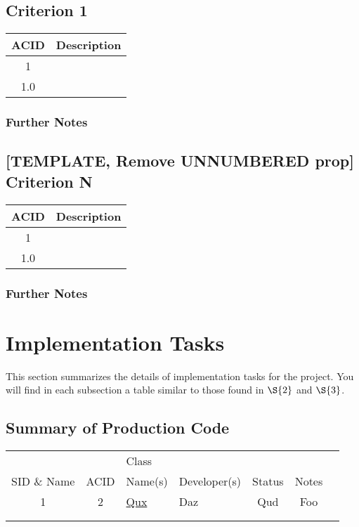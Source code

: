 \documentclass[11pt]{article}
\begin{document}
\subsection{Criterion 1}
\label{sec:org4e14e24}
\begin{center}
\begin{tabular}{|c|l|}
ACID & Description\\
\hline
1 & \\
\hline
1.0 & \\
\end{tabular}
\end{center}

\subsubsection*{Further Notes}
\label{sec:orga558cff}
\subsection*{[TEMPLATE, Remove UNNUMBERED prop] Criterion N}
\label{sec:org7c7ae83}
\begin{center}
\begin{tabular}{|c|l|}
ACID & Description\\
\hline
1 & \\
\hline
1.0 & \\
\end{tabular}
\end{center}

\subsubsection*{Further Notes}
\label{sec:org51f026c}
\section{Implementation Tasks}
\label{sec:orgd0e0923}
This section summarizes the details of implementation tasks for the project. You will find in each
subsection a table similar to those found in \hyperref[sec:org8cd8f44]{\(\S{2}\)} and \hyperref[sec:org76729d4]{\(\S{3}\)}.

\subsection{Summary of Production Code}
\label{sec:org9b1b564}

\begin{center}
\begin{tabular}{|c|c|p{3.5cm}|p{3.5cm}|c|c|c|}
 &  & Class &  &  & \\
SID \& Name & ACID & Name(s) & Developer(s) & Status & Notes\\
\hline
1 & 2 & \hyperref[sec:orgac4b477]{Qux} & Daz & Qud & Foo\\
\hline
 &  &  &  &  & \\
\hline
 &  &  &  &  & \\
\end{tabular}
\end{center}
\end{document}

